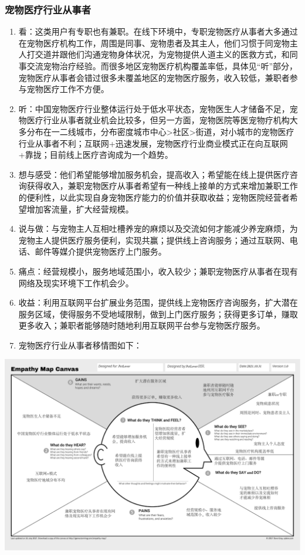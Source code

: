 \documentclass[a4paper]{ctexart}
\begin{document}
\subsubsection{宠物医疗行业从事者}
\begin{enumerate}[label=\alph*.]
  \item 看：这类用户有专职也有兼职。在线下环境中，专职宠物医疗从事者大多通过在宠物医疗机构工作，周围是同事、宠物患者及其主人，他们习惯于同宠物主人打交道并跟他们沟通宠物身体状况，为宠物提供人道主义的医救方式，和同事交流宠物治疗经验。而很多地区宠物医疗机构覆盖率低，具体见“听”部分，宠物医疗从事者会错过很多未覆盖地区的宠物医疗服务，收入较低，兼职者参与宠物医疗工作不方便。
  \item 听：中国宠物医疗行业整体运行处于低水平状态，宠物医生人才储备不足，宠物医疗行业从事者就业机会比较多，但另一方面，宠物医院等医宠物疗机构大多分布在一二线城市，分布密度城市中心>社区>街道，对小城市的宠物医疗行业从事者不利；互联网+迅速发展，宠物医疗行业商业模式正在向互联网+靠拢；目前线上医疗咨询成为一个趋势。
  \item 想与感受：他们希望能够增加服务机会，提高收入；希望能在线上提供医疗咨询获得收入，兼职宠物医疗从事者希望有一种线上接单的方式来增加兼职工作的便利性，以此实现自身宠物医疗能力的价值并获取收益；宠物医院经营者希望增加客流量，扩大经营规模。
  \item 说与做：与宠物主人互相吐槽养宠的麻烦以及交流如何才能减少养宠麻烦，为宠物主人提供医疗服务便利，实现共赢；提供线上咨询服务；通过互联网、电话、邮件等媒介提供宠物医疗上门服务。
  \item 痛点：经营规模小，服务地域范围小，收入较少；兼职宠物医疗从事者在现有网络及现实环境下工作机会少。
  \item 收益：利用互联网平台扩展业务范围，提供线上宠物医疗咨询服务，扩大潜在服务区域，使得服务不受地域限制，做到上门医疗服务；获得更多订单，赚取更多收入；兼职者能够随时随地利用互联网平台参与宠物医疗服务。
  \item 宠物医疗行业从事者移情图如下：
\end{enumerate}
\begin{center}
  \includegraphics[width=16cm]{./移情图/宠物医疗行业从事者}
\end{center}
\end{document}

